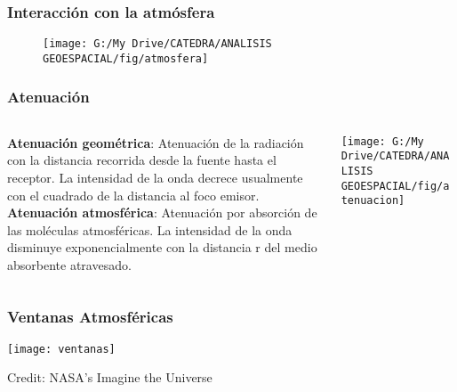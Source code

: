 \documentclass[14pt]{beamer}
\begin{document}
\begin{frame}
\frametitle{Interacción con la atmósfera}
  \begin{figure}
    \centering
    \texttt{[image: G:/My Drive/CATEDRA/ANALISIS GEOESPACIAL/fig/atmosfera]}
  \end{figure}
\end{frame}
\begin{frame}
\frametitle{Atenuación}
  \begin{columns}
		\begin{column}{.4\linewidth}
		 \scriptsize{\textbf{Atenuación geométrica}: Atenuación de la radiación con la distancia recorrida desde la fuente hasta el receptor. La intensidad de la onda decrece usualmente con el cuadrado de la distancia al foco emisor.\\
\textbf{Atenuación atmosférica}: Atenuación por absorción de las moléculas atmosféricas. La intensidad de la onda disminuye exponencialmente con la distancia r del medio absorbente atravesado.}
		\end{column}
		\begin{column}{.6\linewidth}
			 \texttt{[image: G:/My Drive/CATEDRA/ANALISIS GEOESPACIAL/fig/atenuacion]}
		\end{column}
	\end{columns}
\end{frame}
\begin{frame}
\frametitle{Ventanas Atmosféricas}
\begin{center} 
\texttt{[image: ventanas]}
\end{center}
\tiny{Credit: NASA's Imagine the Universe}
\end{frame}
\end{document}
